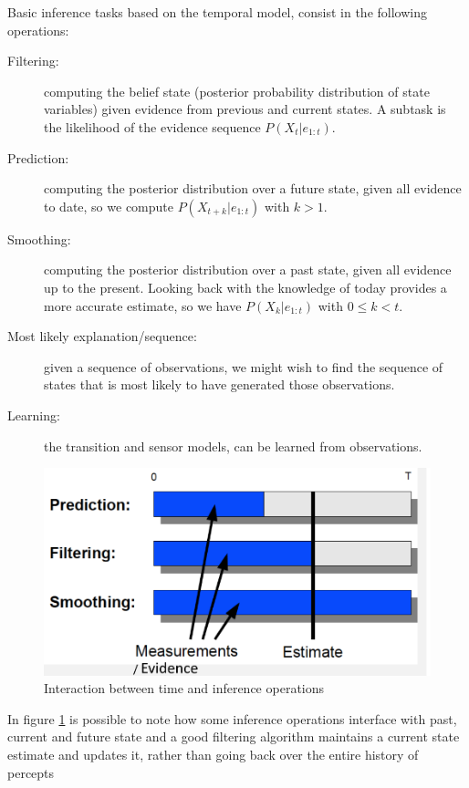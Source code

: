 Basic inference tasks based on the temporal model, consist in the following operations:
\begin{description}
   \item [Filtering:]  computing the belief state (posterior probability distribution of 
	   state variables) given evidence from previous and current states.\newline
	   A subtask is the likelihood of the evidence sequence $P(X_t | e_{1:t})$.
   \item [Prediction: ] computing the posterior distribution over a future state, given all
          evidence to date, so we compute $P(X_{t+k} | e_{1:t})$ with $k > 1$.
   \item [Smoothing: ] computing the posterior distribution over a past state, given all
	   evidence up to the present.\newline
	   Looking back with the knowledge of today provides a more accurate estimate, so
	   we have $P(X_k |e_{1:t})$ with $0 \leq  k < t$.
   \item [Most likely explanation/sequence: ] given a sequence of observations, we might wish
       to find the sequence of states that is most likely to have generated those observations.
   \item [Learning: ] the transition and sensor models, can be learned from observations.
\end{description}
\begin{figure}
	\includegraphics[width=\textwidth]{Images/inferenceOperations}
	\caption{Interaction between time and inference operations}
	\label{img:filtering}
\end{figure}
In figure \ref{img:filtering} is possible to note how some inference operations interface
with past, current and future state and a good filtering algorithm maintains a current state
estimate and updates it, rather than going back over the entire history of percepts
